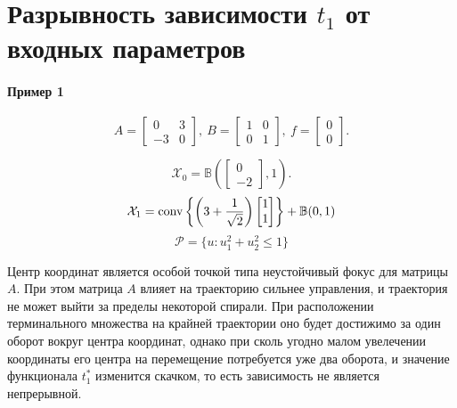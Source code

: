 \documentclass[11pt]{article}
\newcommand\PS{\mathcal{P}}
\newcommand\X{\mathcal{X}}
\newcommand\Cl[2]{\begin{bmatrix}
#1 \\ #2
\end{bmatrix}}
\newcommand\Conv[1]{{\rm conv}\left\{ #1 \right\}}
\begin{document}
\newpage
\section{Разрывность зависимости $t_1$ от входных параметров}

\paragraph{Пример 1\\}
\begin{equation}
A = \begin{bmatrix}
0 & 3 \\ -3 & 0
\end{bmatrix},\ 
B = \begin{bmatrix}
1 & 0 \\ 0 & 1
\end{bmatrix}, \
f = \begin{bmatrix}
0 \\ 0
\end{bmatrix}.
\end{equation}

$$\X_0 = \mathbb{B}\left(\Cl{0}{-2}, 1\right). $$
$$\X_1 = \Conv{\left(3 + \frac1{\sqrt{2}}\right)\Cl{1}{1}} + \mathbb{B}(0, 1) $$
$$\PS = \{u\colon u_1^2 + u_2^2 \le 1\} $$

Центр координат является особой точкой типа неустойчивый фокус для матрицы $A$. При этом матрица
$A$ влияет на траекторию сильнее управления, и траектория не может выйти за пределы некоторой спирали.
При расположении терминального множества на крайней траектории оно будет достижимо за один оборот
вокруг центра координат, однако при сколь угодно малом увелечении координаты его центра на перемещение
потребуется уже два оборота, и значение функционала $t_1^*$ изменится скачком, то есть зависимость не
является непрерывной.
\end{document}
